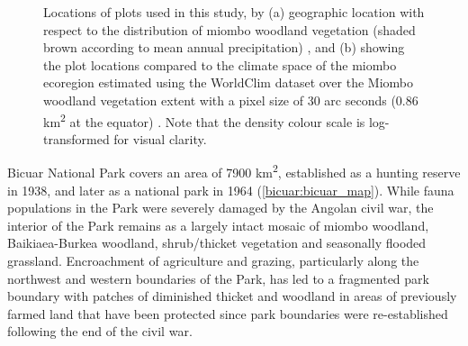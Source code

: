 \begin{refsection}
\begin{figure}[!h]
	\centering
    \qquad
{}%
\caption[Location of study sites within the miombo ecoregion and within climate space]{Locations of plots used in this study, by (a) geographic location with respect to the distribution of miombo woodland vegetation (shaded brown according to mean annual precipitation) \citep{White1983}, and (b) showing the plot locations compared to the climate space of the miombo ecoregion estimated using the WorldClim dataset over the Miombo woodland vegetation extent with a pixel size of 30 arc seconds (0.86 km\textsuperscript{2} at the equator) \citep{Fick2017}. Note that the density colour scale is log-transformed for visual clarity.}
\end{figure}




Bicuar National Park covers an area of \textapprox{}7900 km\textsuperscript{2}, established as a hunting reserve in 1938, and later as a national park in 1964 (\autoref{bicuar:bicuar_map}). While fauna populations in the Park were severely damaged by the Angolan civil war, the interior of the Park remains as a largely intact mosaic of miombo woodland, Baikiaea-Burkea woodland, shrub/thicket vegetation and seasonally flooded grassland. Encroachment of agriculture and grazing, particularly along the northwest and western boundaries of the Park, has led to a fragmented park boundary with patches of diminished thicket and woodland in areas of previously farmed land that have been protected since park boundaries were re-established following the end of the civil war.


\end{refsection}
